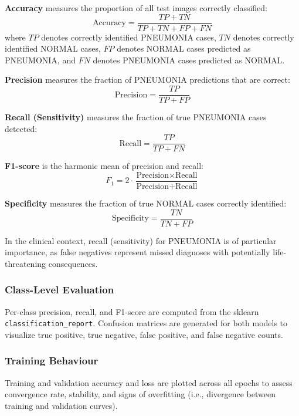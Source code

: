 \documentclass[preprint,12pt]{elsarticle}
\begin{document}
\textbf{Accuracy} measures the proportion of all test images correctly
classified:
\begin{equation}
  \text{Accuracy} = \frac{TP + TN}{TP + TN + FP + FN}
  \label{Eq:Accuracy}
\end{equation}
where $TP$ denotes correctly identified PNEUMONIA cases, $TN$ denotes
correctly identified NORMAL cases, $FP$ denotes NORMAL cases predicted
as PNEUMONIA, and $FN$ denotes PNEUMONIA cases predicted as NORMAL.

\textbf{Precision} measures the fraction of PNEUMONIA predictions that
are correct:
\begin{equation}
  \text{Precision} = \frac{TP}{TP + FP}
  \label{Eq:Precision}
\end{equation}

\textbf{Recall (Sensitivity)} measures the fraction of true PNEUMONIA
cases detected:
\begin{equation}
  \text{Recall} = \frac{TP}{TP + FN}
  \label{Eq:Recall}
\end{equation}

\textbf{F1-score} is the harmonic mean of precision and recall:
\begin{equation}
  F_1 = 2 \cdot \frac{\text{Precision} \times \text{Recall}}
                     {\text{Precision} + \text{Recall}}
  \label{Eq:F1}
\end{equation}

\textbf{Specificity} measures the fraction of true NORMAL cases
correctly identified:
\begin{equation}
  \text{Specificity} = \frac{TN}{TN + FP}
  \label{Eq:Specificity}
\end{equation}

In the clinical context, recall (sensitivity) for PNEUMONIA is of
particular importance, as false negatives represent missed diagnoses
with potentially life-threatening consequences.

\subsubsection{Class-Level Evaluation}
Per-class precision, recall, and F1-score are computed from the
sklearn \texttt{classification\_report}.
Confusion matrices are generated for both models to visualize
true positive, true negative, false positive, and false negative
counts.

\subsubsection{Training Behaviour}
Training and validation accuracy and loss are plotted across all
epochs to assess convergence rate, stability, and signs of overfitting
(i.e., divergence between training and validation curves).
\end{document}
